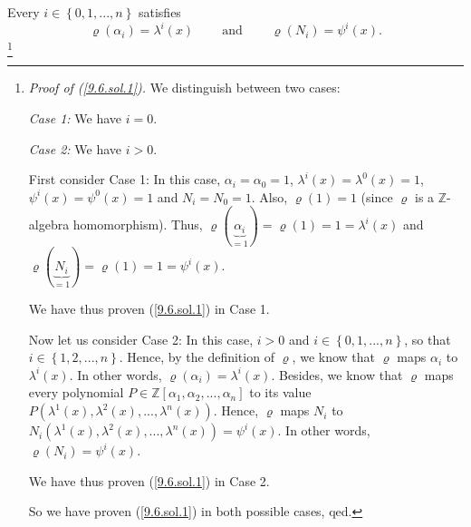 \documentclass[numbers=enddot,12pt,final,onecolumn,notitlepage]{scrartcl}%
\begin{document}
Every $i\in\left\{  0,1,...,n\right\}  $ satisfies
\begin{equation}
\varrho\left(  \alpha_{i}\right)  =\lambda^{i}\left(  x\right)
\ \ \ \ \ \ \ \ \ \ \text{and}\ \ \ \ \ \ \ \ \ \ \varrho\left(  N_{i}\right)
=\psi^{i}\left(  x\right)  . \label{9.6.sol.1}%
\end{equation}
\footnote{\textit{Proof of (\ref{9.6.sol.1}).} We distinguish between two
cases:
\par
\textit{Case 1:} We have $i=0$.
\par
\textit{Case 2:} We have $i>0$.
\par
First consider Case 1: In this case, $\alpha_{i}=\alpha_{0}=1$, $\lambda
^{i}\left(  x\right)  =\lambda^{0}\left(  x\right)  =1$, $\psi^{i}\left(
x\right)  =\psi^{0}\left(  x\right)  =1$ and $N_{i}=N_{0}=1$. Also,
$\varrho\left(  1\right)  =1$ (since $\varrho$ is a $\mathbb{Z}$-algebra
homomorphism). Thus, $\varrho\left(  \underbrace{\alpha_{i}}_{=1}\right)
=\varrho\left(  1\right)  =1=\lambda^{i}\left(  x\right)  $ and $\varrho
\left(  \underbrace{N_{i}}_{=1}\right)  =\varrho\left(  1\right)  =1=\psi
^{i}\left(  x\right)  $.
\par
We have thus proven (\ref{9.6.sol.1}) in Case 1.
\par
Now let us consider Case 2: In this case, $i>0$ and $i\in\left\{
0,1,...,n\right\}  $, so that $i\in\left\{  1,2,...,n\right\}  $. Hence, by
the definition of $\varrho$, we know that $\varrho$ maps $\alpha_{i}$ to
$\lambda^{i}\left(  x\right)  $. In other words, $\varrho\left(  \alpha
_{i}\right)  =\lambda^{i}\left(  x\right)  $. Besides, we know that $\varrho$
maps every polynomial $P\in\mathbb{Z}\left[  \alpha_{1},\alpha_{2}%
,...,\alpha_{n}\right]  $ to its value $P\left(  \lambda^{1}\left(  x\right)
,\lambda^{2}\left(  x\right)  ,...,\lambda^{n}\left(  x\right)  \right)  $.
Hence, $\varrho$ maps $N_{i}$ to $N_{i}\left(  \lambda^{1}\left(  x\right)
,\lambda^{2}\left(  x\right)  ,...,\lambda^{n}\left(  x\right)  \right)
=\psi^{i}\left(  x\right)  $. In other words, $\varrho\left(  N_{i}\right)
=\psi^{i}\left(  x\right)  $.
\par
We have thus proven (\ref{9.6.sol.1}) in Case 2.
\par
So we have proven (\ref{9.6.sol.1}) in both possible cases, qed.}
\end{document}
